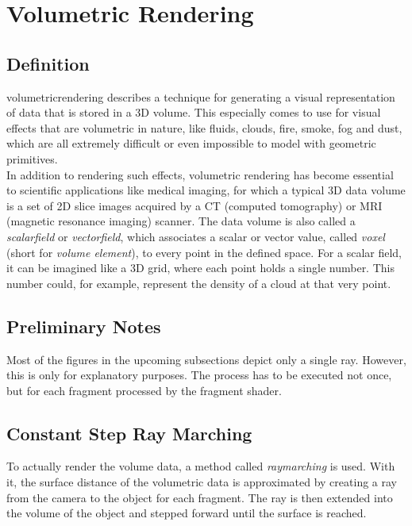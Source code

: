 \section{Volumetric Rendering}
\label{section:volumetric-rendering}

\subsection{Definition}
\Gls{volumetricrendering} describes a technique for generating a visual representation of data that is stored in a 3D volume. 
This especially comes to use for visual effects that are volumetric in nature, like fluids, clouds, fire, smoke, fog and dust, which are all extremely difficult or even impossible to model with geometric primitives.
\\
In addition to rendering such effects, volumetric rendering has become essential to scientific applications like medical imaging, for which a typical 3D data volume is a set of 2D slice images acquired by a CT (computed tomography) or MRI (magnetic resonance imaging) scanner.
\emptyline
The data volume is also called a \textit{\gls{scalarfield}} or \textit{\gls{vectorfield}}, which associates a scalar or vector value, called \textit{\gls{voxel}} (short for \textit{volume element}), to every point in the defined space.
For a scalar field, it can be imagined like a 3D grid, where each point holds a single number. This number could, for example, represent the density of a cloud at that very point.

\subsection{Preliminary Notes}
Most of the figures in the upcoming subsections depict only a single ray. However, this is only for explanatory purposes. The process has to be executed not once, but for each fragment processed by the fragment shader.

\subsection{Constant Step Ray Marching}
To actually render the volume data, a method called \textit{\gls{raymarching}} is used. With it, the surface distance of the volumetric data is approximated by creating a ray from the camera to the object for each fragment. The ray is then extended into the volume of the object and stepped forward until the surface is reached.

